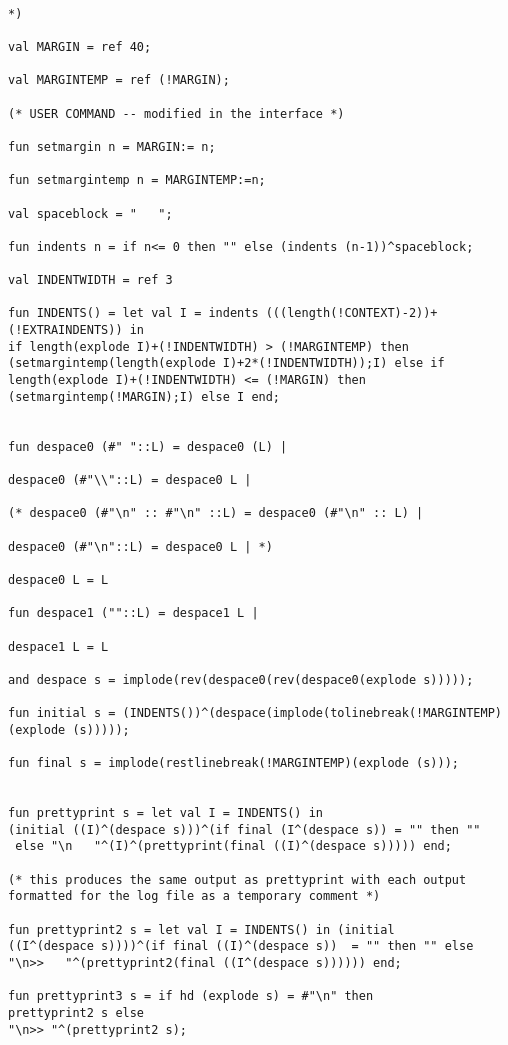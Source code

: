 \documentclass{article}
\begin{document}
\begin{verbatim}

*)

val MARGIN = ref 40;

val MARGINTEMP = ref (!MARGIN);

(* USER COMMAND -- modified in the interface *)

fun setmargin n = MARGIN:= n;

fun setmargintemp n = MARGINTEMP:=n;

val spaceblock = "   ";

fun indents n = if n<= 0 then "" else (indents (n-1))^spaceblock;

val INDENTWIDTH = ref 3

fun INDENTS() = let val I = indents (((length(!CONTEXT)-2))+(!EXTRAINDENTS)) in
if length(explode I)+(!INDENTWIDTH) > (!MARGINTEMP) then (setmargintemp(length(explode I)+2*(!INDENTWIDTH));I) else if length(explode I)+(!INDENTWIDTH) <= (!MARGIN) then (setmargintemp(!MARGIN);I) else I end;


fun despace0 (#" "::L) = despace0 (L) |

despace0 (#"\\"::L) = despace0 L |

(* despace0 (#"\n" :: #"\n" ::L) = despace0 (#"\n" :: L) |

despace0 (#"\n"::L) = despace0 L | *)

despace0 L = L

fun despace1 (""::L) = despace1 L |

despace1 L = L

and despace s = implode(rev(despace0(rev(despace0(explode s)))));

fun initial s = (INDENTS())^(despace(implode(tolinebreak(!MARGINTEMP)(explode (s)))));

fun final s = implode(restlinebreak(!MARGINTEMP)(explode (s)));


fun prettyprint s = let val I = INDENTS() in 
(initial ((I)^(despace s)))^(if final (I^(despace s)) = "" then ""
 else "\n   "^(I)^(prettyprint(final ((I)^(despace s))))) end;

(* this produces the same output as prettyprint with each output
formatted for the log file as a temporary comment *)

fun prettyprint2 s = let val I = INDENTS() in (initial 
((I^(despace s))))^(if final ((I)^(despace s))  = "" then "" else
"\n>>   "^(prettyprint2(final ((I^(despace s)))))) end;

fun prettyprint3 s = if hd (explode s) = #"\n" then 
prettyprint2 s else
"\n>> "^(prettyprint2 s);


\end{verbatim}
\end{document}
